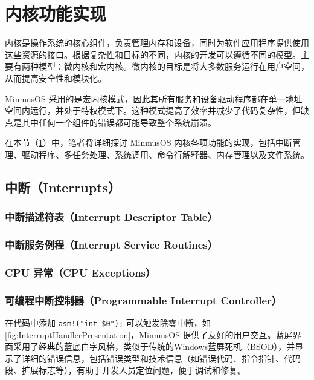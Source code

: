 \section{内核功能实现}\label{sec:KernelFunctionalityImplementation}

内核是操作系统的核心组件，负责管理内存和设备，同时为软件应用程序提供使用这些资源的接口。根据复杂性和目标的不同，内核的开发可以遵循不同的模型。主要有两种模型：微内核和宏内核。微内核的目标是将大多数服务运行在用户空间，从而提高安全性和模块化。

MinmusOS 采用的是宏内核模式，因此其所有服务和设备驱动程序都在单一地址空间内运行，并处于特权模式下。这种模式提高了效率并减少了代码复杂性，但缺点是其中任何一个组件的错误都可能导致整个系统崩溃。

在本节（\cref{sec:KernelFunctionalityImplementation}）中，笔者将详细探讨 MinmusOS 内核各项功能的实现，包括中断管理、驱动程序、多任务处理、系统调用、命令行解释器、内存管理以及文件系统。

\subsection{中断（Interrupts）}

\subsubsection{中断描述符表（Interrupt Descriptor Table）}

\subsubsection{中断服务例程（Interrupt Service Routines）}

\subsubsection{CPU 异常（CPU Exceptions）}

\subsubsection{可编程中断控制器（Programmable Interrupt Controller）}

在代码中添加 \texttt{asm!("int \$0");} 可以触发除零中断，如\cref{fig:InterruptHandlerPresentation}，MinmusOS 提供了友好的用户交互。蓝屏界面采用了经典的蓝底白字风格，类似于传统的Windows蓝屏死机（BSOD），并显示了详细的错误信息，包括错误类型和技术信息（如错误代码、指令指针、代码段、扩展标志等），有助于开发人员定位问题，便于调试和修复。

